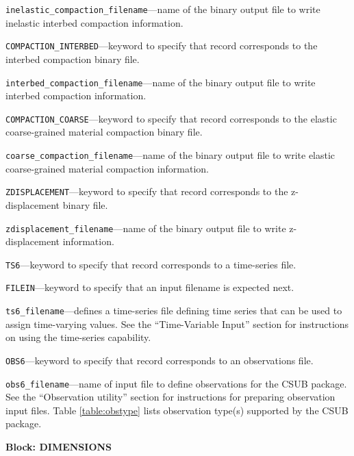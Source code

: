 \begin{description}
\item \texttt{inelastic\_compaction\_filename}---name of the binary output file to write inelastic interbed compaction information.

\item \texttt{COMPACTION\_INTERBED}---keyword to specify that record corresponds to the interbed compaction binary file.

\item \texttt{interbed\_compaction\_filename}---name of the binary output file to write interbed compaction information.

\item \texttt{COMPACTION\_COARSE}---keyword to specify that record corresponds to the elastic coarse-grained material compaction binary file.

\item \texttt{coarse\_compaction\_filename}---name of the binary output file to write elastic coarse-grained material compaction information.

\item \texttt{ZDISPLACEMENT}---keyword to specify that record corresponds to the z-displacement binary file.

\item \texttt{zdisplacement\_filename}---name of the binary output file to write z-displacement information.

\item \texttt{TS6}---keyword to specify that record corresponds to a time-series file.

\item \texttt{FILEIN}---keyword to specify that an input filename is expected next.

\item \texttt{ts6\_filename}---defines a time-series file defining time series that can be used to assign time-varying values. See the ``Time-Variable Input'' section for instructions on using the time-series capability.

\item \texttt{OBS6}---keyword to specify that record corresponds to an observations file.

\item \texttt{obs6\_filename}---name of input file to define observations for the CSUB package. See the ``Observation utility'' section for instructions for preparing observation input files. Table \ref{table:obstype} lists observation type(s) supported by the CSUB package.

\end{description}
\item \textbf{Block: DIMENSIONS}

